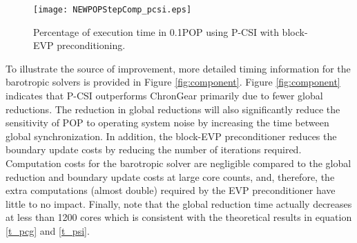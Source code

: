 \begin {figure}[t!]
\centering
\texttt{[image: NEWPOPStepComp\_pcsi.eps]}
\caption[] {Percentage of execution time in 0.1\degree\space POP using
  P-CSI with block-EVP preconditioning.\label{fig:StepComp_pcsi}}
\end{figure}




To illustrate the source of improvement, more detailed timing
information for the barotropic solvers is provided in Figure
\ref{fig:component}.  Figure \ref{fig:component} indicates that P-CSI
outperforms ChronGear primarily due to fewer global reductions. The
reduction in global reductions will also significantly reduce the
sensitivity of POP to operating system noise \cite{ferreira} by increasing the time between global synchronization.  In
addition, the block-EVP preconditioner reduces the boundary update
costs by reducing the number of iterations required.  Computation
costs for the barotropic solver are negligible compared to the global
reduction and boundary update costs at large core
counts, and, therefore, the extra computations (almost double)
required by the EVP preconditioner have little to no impact.  Finally, note that the global reduction time actually decreases at less than 1200 cores which is consistent with the theoretical results in equation \ref{t_pcg} and \ref{t_psi}.




